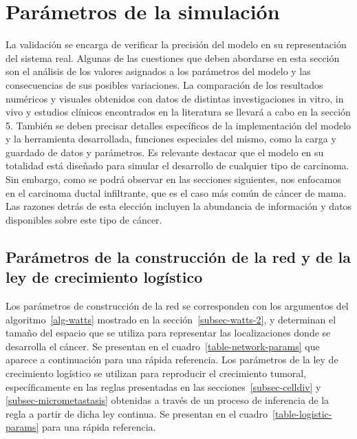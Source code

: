 \chapter{Par\'ametros de la simulaci\'on}\label{chapter:proposal}
\label{sec-validation}
La validación se encarga de verificar la precisión del modelo en su representación del sistema real. Algunas de las cuestiones que deben abordarse en esta sección son el análisis de los valores asignados a los parámetros del modelo y las consecuencias de sus posibles variaciones. La comparación de los resultados numéricos y visuales obtenidos con datos de distintas investigaciones in vitro, in vivo y estudios clínicos encontrados en la literatura se llevará a cabo en la sección 5. Tambi\'en se deben precisar detalles espec\'ificos de la implementaci\'on del modelo y la herramienta desarrollada, funciones especiales del mismo, como la carga y guardado de datos y par\'ametros. Es relevante destacar que el modelo en su totalidad está diseñado para simular el desarrollo de cualquier tipo de carcinoma. Sin embargo, como se podrá observar en las secciones siguientes, nos enfocamos en el carcinoma ductal infiltrante, que es el caso más común de cáncer de mama. Las razones detrás de esta elección incluyen la abundancia de información y datos disponibles sobre este tipo de cáncer.

\section{Par\'ametros de la construcci\'on de la red y de la ley de crecimiento log\'istico}
\label{subsec-network-param}
Los par\'ametros de construcci\'on de la red se corresponden con los argumentos del algoritmo~\ref{alg-watts} mostrado en la secci\'on~\ref{subsec-watts-2}, y determinan el tama\~no del espacio que se utiliza para representar las localizaciones donde se desarrolla el c\'ancer. Se presentan en el cuadro~\ref{table-network-params} que aparece a continuaci\'on para una r\'apida referencia. Los par\'ametros de la ley de crecimiento log\'istico se utilizan para reproducir el crecimiento tumoral, espec\'ificamente en las reglas presentadas en las secciones~\ref{subsec-celldiv} y \ref{subsec-micrometastasis} obtenidas a trav\'es de un proceso de inferencia de la regla a partir de dicha ley continua. Se presentan en el cuadro~\ref{table-logistic-params} para una r\'apida referencia.

